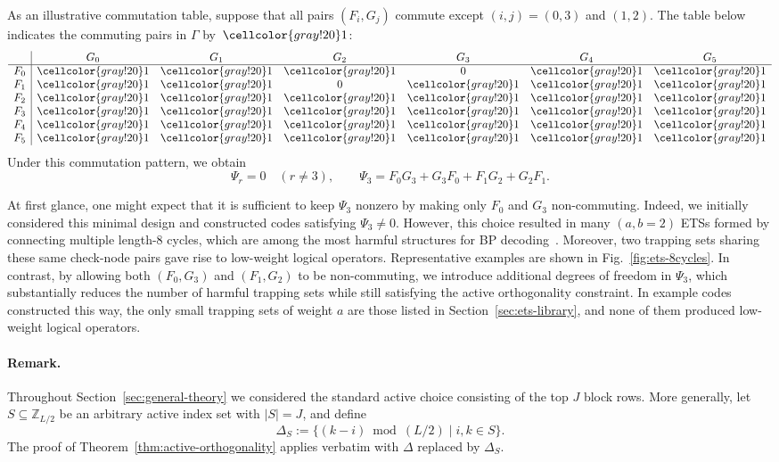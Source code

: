 \documentclass[a4paper,onecolumn,11pt,accepted=2026-08-03]{quantumarticle}
\newcommand{\Creq}{\cellcolor{gray!20}1}
\renewcommand\[{\begin{equation}}
\renewcommand\]{\end{equation}}
\theoremstyle{definition}
\begin{document}
As an illustrative commutation table, suppose that all pairs $(F_i,G_j)$ commute except
$(i,j)=(0,3)$ and $(1,2)$.
The table below indicates the commuting pairs in $\Gamma$ by~$\Creq$:
\[
\begin{array}{c|cccccc}
 & G_0 & G_1 & G_2 & G_3 & G_4 & G_5\\ \hline
F_0 & \Creq & \Creq & \Creq & 0 & \Creq & \Creq\\
F_1 & \Creq & \Creq & 0 & \Creq & \Creq & \Creq\\
F_2 & \Creq & \Creq & \Creq & \Creq & \Creq & \Creq\\
F_3 & \Creq & \Creq & \Creq & \Creq & \Creq & \Creq\\
F_4 & \Creq & \Creq & \Creq & \Creq & \Creq & \Creq\\
F_5 & \Creq & \Creq & \Creq & \Creq & \Creq & \Creq
\end{array}
\]
Under this commutation pattern, we obtain
\[
\Psi_r=0\quad (r\neq 3), \qquad
\Psi_3=F_0G_3+G_3F_0+F_1G_2+G_2F_1.
\]

At first glance, one might expect that it is sufficient to keep $\Psi_3$ nonzero by making only
$F_0$ and $G_3$ non-commuting.
Indeed, we initially considered this minimal design and constructed codes satisfying $\Psi_3\neq 0$.
However, this choice resulted in many $(a,b=2)$   ETSs  formed by connecting multiple
length-8 cycles, which are among the most harmful structures for BP decoding~\cite{Richardson2003ErrorFloors}.
Moreover, two trapping sets sharing these same check-node pairs gave rise to low-weight logical operators.
Representative examples are shown in Fig.~\ref{fig:ets-8cycles}.
In contrast, by allowing both $(F_0,G_3)$ and $(F_1,G_2)$ to be non-commuting, we introduce additional
degrees of freedom in $\Psi_3$, which substantially reduces the number of harmful trapping sets while still
satisfying the active orthogonality constraint.
In example codes constructed this way, the only small trapping sets of weight $a$ are those listed in Section~\ref{sec:ets-library},
and none of them produced low-weight logical operators.

\paragraph{Remark.}
Throughout Section~\ref{sec:general-theory} we considered the standard active choice consisting of the top $J$ block
rows.
More generally, let $S\subseteq\mathbb{Z}_{L/2}$ be an arbitrary active index set with $|S|=J$,
and define
\[
\Delta_S := \{(k-i)\bmod (L/2) \mid i,k\in S\}.
\]
The proof of Theorem~\ref{thm:active-orthogonality} applies verbatim with $\Delta$ replaced by $\Delta_S$.
\end{document}
